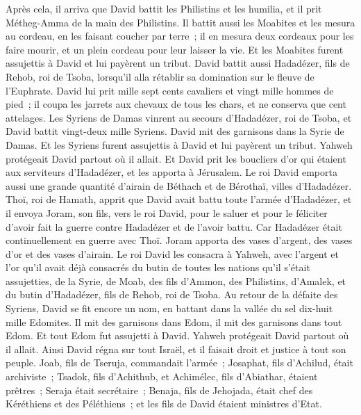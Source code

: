 \begin{multicols}{2}
\VerseOne{}Après cela, il arriva que David battit les Philistins et les humilia, et il prit Métheg-Amma de la main des Philistins.
Il battit aussi les Moabites et les mesura au cordeau, en les faisant coucher par terre~; il en mesura deux cordeaux pour les faire mourir, et un plein cordeau pour leur laisser la vie. Et les Moabites furent assujettis à David et lui payèrent un tribut.
David battit aussi Hadadézer, fils de Rehob, roi de Tsoba, lorsqu'il alla rétablir sa domination sur le fleuve de l'Euphrate.
David lui prit mille sept cents cavaliers et vingt mille hommes de pied~; il coupa les jarrets aux chevaux de tous les chars, et ne conserva que cent attelages.
Les Syriens de Damas vinrent au secours d'Hadadézer, roi de Tsoba, et David battit vingt-deux mille Syriens.
David mit des garnisons dans la Syrie de Damas. Et les Syriens furent assujettis à David et lui payèrent un tribut. Yahweh protégeait David partout où il allait.
Et David prit les boucliers d'or qui étaient aux serviteurs d'Hadadézer, et les apporta à Jérusalem.
Le roi David emporta aussi une grande quantité d'airain de Béthach et de Bérothaï, villes d'Hadadézer.
Thoï, roi de Hamath, apprit que David avait battu toute l'armée d'Hadadézer,
et il envoya Joram, son fils, vers le roi David, pour le saluer et pour le féliciter d'avoir fait la guerre contre Hadadézer et de l'avoir battu. Car Hadadézer était continuellement en guerre avec Thoï. Joram apporta des vases d'argent, des vases d'or et des vases d'airain.
Le roi David les consacra à Yahweh, avec l'argent et l'or qu'il avait déjà consacrés du butin de toutes les nations qu'il s'était assujetties,
de la Syrie, de Moab, des fils d'Ammon, des Philistins, d'Amalek, et du butin d'Hadadézer, fils de Rehob, roi de Tsoba.
Au retour de la défaite des Syriens, David se fit encore un nom, en battant dans la vallée du sel dix-huit mille Edomites.
Il mit des garnisons dans Edom, il mit des garnisons dans tout Edom. Et tout Edom fut assujetti à David. Yahweh protégeait David partout où il allait.
Ainsi David régna sur tout Israël, et il faisait droit et justice à tout son peuple.
Joab, fils de Tseruja, commandait l'armée~; Josaphat, fils d'Achilud, était archiviste~;
Tsadok, fils d'Achithub, et Achimélec, fils d'Abiathar, étaient prêtres~; Seraja était secrétaire~;
Benaja, fils de Jehojada, était chef des Kéréthiens et des Péléthiens~; et les fils de David étaient ministres d'Etat.

\end{multicols}
